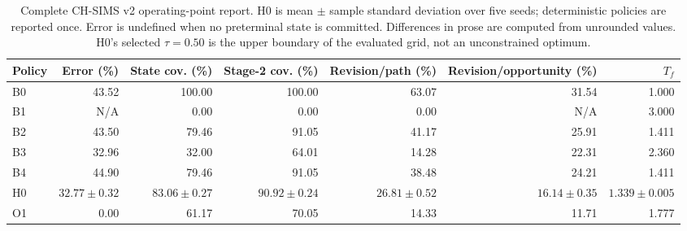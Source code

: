 \begin{table}[t]
\centering
\caption{Complete CH-SIMS v2 operating-point report. H0 is mean \(\pm\) sample standard deviation over five seeds; deterministic policies are reported once. Error is undefined when no preterminal state is committed. Differences in prose are computed from unrounded values. H0's selected \(\tau=0.50\) is the upper boundary of the evaluated grid, not an unconstrained optimum.}
\label{tab:all-policies}
\begin{tabular}{lrrrrrr}
\toprule
Policy & Error (\%) & State cov. (\%) & Stage-2 cov. (\%) & Revision/path (\%) & Revision/opportunity (\%) & \(T_f\) \\
\midrule
B0 & 43.52 & 100.00 & 100.00 & 63.07 & 31.54 & 1.000 \\
B1 & N/A & 0.00 & 0.00 & 0.00 & N/A & 3.000 \\
B2 & 43.50 & 79.46 & 91.05 & 41.17 & 25.91 & 1.411 \\
B3 & 32.96 & 32.00 & 64.01 & 14.28 & 22.31 & 2.360 \\
B4 & 44.90 & 79.46 & 91.05 & 38.48 & 24.21 & 1.411 \\
H0 & \(32.77\pm0.32\) & \(83.06\pm0.27\) & \(90.92\pm0.24\) & \(26.81\pm0.52\) & \(16.14\pm0.35\) & \(1.339\pm0.005\) \\
O1 & 0.00 & 61.17 & 70.05 & 14.33 & 11.71 & 1.777 \\
\bottomrule
\end{tabular}
\end{table}

